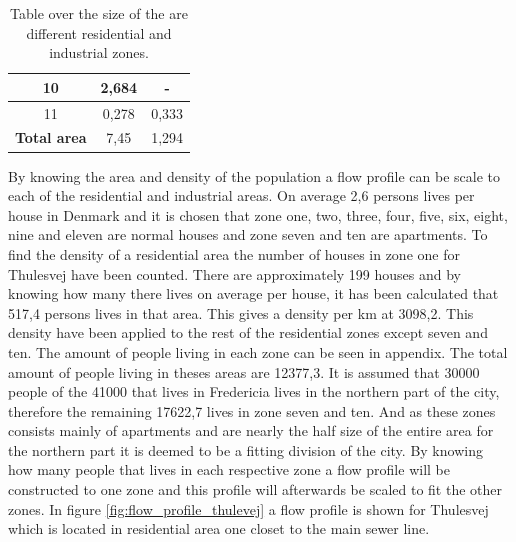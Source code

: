 \begin{table}[H]
\begin{tabular}{|c|c|c|}
10            & 2,684                                                                        & -                                                                           \\ \hline
11            & 0,278                                                                        & 0,333                                                                       \\ \hline
\textbf{Total area}    & 7,45                                                                & 1,294                                                                       \\ \hline
\end{tabular}
\caption{Table over the size of the are different residential and industrial zones.}
\label{tab:size_of_areas}
\end{table}

By knowing the area and density of the population a flow profile can be scale to each of the residential and industrial areas. On average 2,6 persons lives per house in Denmark and it is chosen that zone one, two, three, four, five, six, eight, nine and eleven are normal houses and zone seven and ten are apartments. To find the density of a residential area the number of houses in zone one for Thulesvej have been counted. There are approximately 199 houses and by knowing how many there lives on average per house, it has been calculated that 517,4 persons lives in that area. This gives a density per km at 3098,2. This density have been applied to the rest of the residential zones except seven and ten. The amount of people living in each zone can be seen in appendix. The total amount of people living in theses areas are 12377,3. It is assumed that 30000 people of the 41000 that lives in Fredericia lives in the northern part of the city, therefore the remaining 17622,7 lives in zone seven and ten. And as these zones consists mainly of apartments and are nearly the half size of the entire area for the northern part it is deemed to be a fitting division of the city. By knowing how many people that lives in each respective zone a flow profile will be constructed to one zone and this profile will afterwards be scaled to fit the other zones. In figure \ref{fig:flow_profile_thulevej} a flow profile is shown for Thulesvej which is located in residential area one closet to the main sewer line. 


